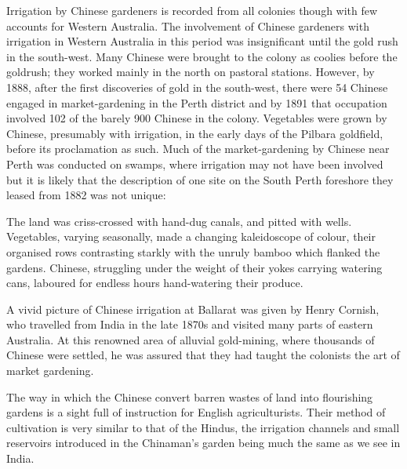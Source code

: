 Irrigation by Chinese  gardeners is recorded from all
colonies though with few accounts for Western
Australia.  The involvement of Chinese
gardeners with irrigation in Western Australia in this period was
insignificant until the gold rush in the south-west.  Many Chinese
were brought to the colony as coolies before the goldrush; they worked
main\-ly in the north on pastoral stations.  However, by 1888, after
the first discoveries of gold in the south-west, there were 54 Chinese
engaged in market-gardening in the Perth district and by 1891 that
occupation involved 102 of the barely 900 Chinese in the colony.
Vegetables were grown by Chinese, presumably with irrigation, in the
early days of the Pilbara 
goldfield, before its proclamation as
such.  Much of the market-gardening by
Chinese near Perth  was conducted on swamps, where
irrigation may not have been involved but it is likely that the
description of one site on the South Perth foreshore they leased from
1882 was not unique:
\begin{Quote}
	The land was criss-crossed with hand-dug
	canals, and pitted with
	wells.  Vegetables, varying seasonally, made a changing
	kaleidoscope of colour, their organised rows contrasting
	starkly with the unruly bamboo which flanked the gardens.
	Chinese, struggling under the weight of their yokes carrying
	watering cans, laboured for endless hours hand-watering their
	produce.
\end{Quote}

A vivid picture of Chinese irrigation at Ballarat
 was given by Henry Cornish, 
who travelled from India in the late 1870s and visited many parts of
eastern Australia. At this renowned area of alluvial gold-min\-ing,
 where thousands of Chinese were settled, he was
assured that they had taught the colonists the art of market
gardening.
\begin{Quote}
	The way in which the Chinese convert barren wastes of land
	into flourishing gardens is a sight full of instruction for
	English agriculturists. Their method of cultivation is very
	similar to that of the Hindus, the irrigation
	channels and small
	reservoirs introduced in the
	Chinaman's garden being much the same as we see in
	India.
\end{Quote}

